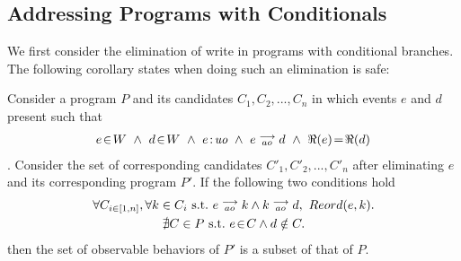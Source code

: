 \subsection{Addressing Programs with Conditionals}
    We first consider the elimination of write in programs with conditional branches. The following corollary states when doing such an elimination is safe: 

    \begin{corollary}
        \label{WriteElimCond}
        Consider a program $P$ and its candidates $C_1, C_2, ... , C_n$ in which events $e$ and $d$ present such that 
        \begin{align*}
            \event{e}{W} \ \wedge \ \event{d}{W} \ \wedge \ \et{e}{uo} \ \wedge \ \reln{e}{ao}{d} \ \wedge \ \Re(e)\!=\!\Re(d)
        \end{align*} . 
        Consider the set of corresponding candidates $C'_1, C'_2, ... , C'_n$ after eliminating $e$ and its corresponding program $P'$. If the following two conditions hold
        \begin{gather*}
            \forall C_{i \in [1,n]}, \forall k \in C_i \ \text{s.t.} \ \reln{e}{ao}{k} \wedge \reln{k}{ao}{d}, \    
            Reord(e,k). \\   
            \nexists C \in P \ \text{s.t.} \ \event{e}{C} \wedge d \notin C.
        \end{gather*}
        then the set of observable behaviors of $P'$ is a subset of that of $P$.
    \end{corollary}

